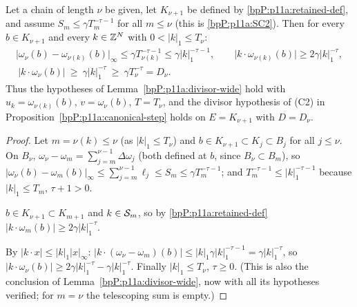 \begin{lemma}\label{bpP:p11a:finite-divisor}
Let a chain of length $\nu$ be given, let $K_{\nu+1}$ be defined by \eqref{bpP:p11a:retained-def}, and assume $S_m\le\gamma T_m^{-\tau-1}$ for all $m\le\nu$ (this is \ref{bpP:p11a:SC2}). Then for every $b\in K_{\nu+1}$ and every $k\in\mathbb{Z}^N$ with $0<\lvert k\rvert_1\le T_\nu$:
\begin{gather*}\lvert\omega_\nu(b)-\omega_{\nu(k)}(b)\rvert_\infty\le\gamma T_{\nu(k)}^{-\tau-1}\le\gamma\lvert k\rvert_1^{-\tau-1},\qquad\lvert k\cdot\omega_{\nu(k)}(b)\rvert\ge2\gamma\lvert k\rvert_1^{-\tau},\\ \boxed{\ \lvert k\cdot\omega_\nu(b)\rvert\ \ge\ \gamma\lvert k\rvert_1^{-\tau}\ \ge\ \gamma T_\nu^{-\tau}=D_\nu.\ }\end{gather*}
Thus the hypotheses of Lemma~\ref{bpP:p11a:divisor-wide} hold with $u_k=\omega_{\nu(k)}(b)$, $v=\omega_\nu(b)$, $T=T_\nu$, and the divisor hypothesis of (C2) in Proposition~\ref{bpP:p11a:canonical-step} holds on $E=K_{\nu+1}$ with $D=D_\nu$.
\end{lemma}
\begin{proof}
\label{stepP:p11a:fd-tel} Let $m=\nu(k)\le\nu$ (as $\lvert k\rvert_1\le T_\nu$) and $b\in K_{\nu+1}\subset K_j\subset B_j$ for all $j\le\nu$. On $B_\nu$, $\omega_\nu-\omega_m=\sum_{j=m}^{\nu-1}\Delta\omega_j$ (both defined at $b$, since $B_\nu\subset B_m$), so $\lvert\omega_\nu(b)-\omega_m(b)\rvert_\infty\le\sum_{j=m}^{\nu-1}\ell_j\le S_m\le\gamma T_m^{-\tau-1}$; and $T_m^{-\tau-1}\le\lvert k\rvert_1^{-\tau-1}$ because $\lvert k\rvert_1\le T_m$, $\tau+1>0$.

\label{stepP:p11a:fd-test} $b\in K_{\nu+1}\subset K_{m+1}$ and $k\in\mathcal S_m$, so by \eqref{bpP:p11a:retained-def} $\lvert k\cdot\omega_m(b)\rvert\ge2\gamma\lvert k\rvert_1^{-\tau}$.

\label{stepP:p11a:fd-concl} By $\lvert k\cdot x\rvert\le\lvert k\rvert_1\lvert x\rvert_\infty$: $\lvert k\cdot(\omega_\nu-\omega_m)(b)\rvert\le\lvert k\rvert_1\gamma\lvert k\rvert_1^{-\tau-1}=\gamma\lvert k\rvert_1^{-\tau}$, so $\lvert k\cdot\omega_\nu(b)\rvert\ge2\gamma\lvert k\rvert_1^{-\tau}-\gamma\lvert k\rvert_1^{-\tau}$. Finally $\lvert k\rvert_1\le T_\nu$, $\tau\ge0$. (This is also the conclusion of Lemma~\ref{bpP:p11a:divisor-wide}, now with all its hypotheses verified; for $m=\nu$ the telescoping sum is empty.)
\end{proof}

